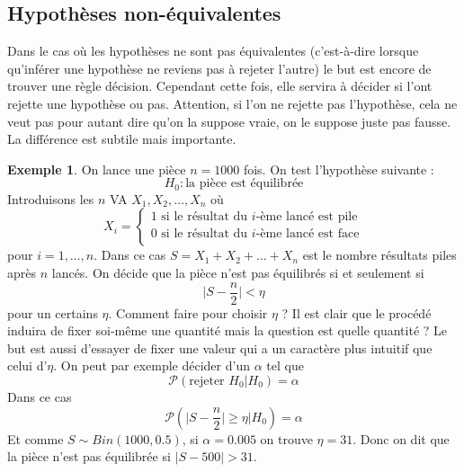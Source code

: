\documentclass[a4paper,12pt]{report}
\theoremstyle{definition}
\renewcommand{\(}{\left(}
\renewcommand{\)}{\right)}
\renewcommand{\P}{\mathcal{P}}
\renewcommand{\t}{\text}
\newtheorem{exmp}[thm]{Exemple}
\begin{document}
        \subsection{Hypothèses non-équivalentes}
            
            Dans le cas où les hypothèses ne sont pas équivalentes (c'est-à-dire lorsque qu'inférer une hypothèse ne reviens pas à rejeter l'autre) le but est encore de trouver une règle décision. Cependant cette fois, elle servira à décider si l'ont rejette une hypothèse ou pas. Attention, si l'on ne rejette pas l'hypothèse, cela ne veut pas pour autant dire qu'on la suppose vraie, on le suppose juste pas fausse. La différence est subtile mais importante.
            
            \begin{exmp}
                On lance une pièce $n=1000$ fois. On test l'hypothèse suivante : 
                $$H_0 : \t{la pièce est équilibrée}$$
                Introduisons les $n$ VA $X_1,X_2,\dots,X_n$ où 
                $$X_i = \begin{cases}
                1 \t{ si le résultat du $i$-ème lancé est pile}\\
                0 \t{ si le résultat du $i$-ème lancé est face}\\
                \end{cases}$$
                pour $i=1,\dots,n$. Dans ce cas $S=X_1+X_2+\dots+X_n$ est le nombre résultats piles après $n$ lancés. On décide que la pièce n'est pas équilibrés si et seulement si
                $$\bigg| S-\frac{n}{2}\bigg| < \eta $$
                pour un certains $\eta$. Comment faire pour choisir $\eta$ ? Il est clair que le procédé induira de fixer soi-même une quantité mais la question est quelle quantité ? Le but est aussi d'essayer de fixer une valeur qui a un caractère plus intuitif que celui d'$\eta$. On peut par exemple décider d'un $\alpha$ tel que 
                $$\P(\t{rejeter }H_0|H_0) = \alpha$$
                Dans ce cas 
                $$\P\left(\bigg| S-\frac{n}{2}\bigg| \geq \eta \bigg| H_0\right) = \alpha$$
                Et comme $S\sim Bin(1000,0.5)$, si $\alpha=0.005$ on trouve $\eta = 31$. Donc on dit que la pièce n'est pas équilibrée si $|S-500|>31$.
            \end{exmp}
            
\end{document}

